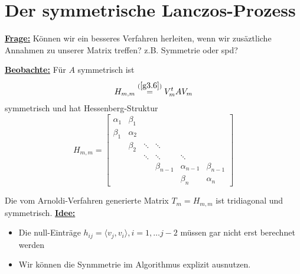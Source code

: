 \documentclass{book}
\begin{document}
        \section{Der symmetrische Lanczos-Prozess}

            \underline{\textbf{Frage:}} Können wir ein besseres Verfahren herleiten, wenn wir zusäztliche
            Annahmen zu unserer Matrix treffen?
            z.B. Symmetrie oder spd?

            \underline{\textbf{Beobachte:}} Für $A$ symmetrisch ist 
            \begin{equation*}
                H_{m,m} \stackrel{(\ref{g3.6})}{=} V_m^t A V_m
            \end{equation*}
            symmetrisch und hat Hessenberg-Struktur 
            \begin{equation*}
                H_{m,m}=\begin{bmatrix}
                    \alpha_1 & \beta_1 & & & & \\
                    \beta_1 & \alpha_2 & & & & \\
                     & \beta_2 & \ddots & \ddots&  & \\
                     &  & \ddots & \ddots & \ddots  & \\
                     &  & & \beta_{n-1} & \alpha_{n-1} & \beta_{n-1}\\
                     &  & & & \beta_n & \alpha_n 
                \end{bmatrix}
            \end{equation*} 

            Die vom Arnoldi-Verfahren generierte Matrix $T_m=H_{m,m}$ ist tridiagonal und symmetrisch.
            \underline{\textbf{Idee:}} 
            \begin{itemize}
                \item Die null-Einträge $h_{ij}=\langle v_j,v_i \rangle, i=1,\dots j-2$ müssen gar nicht erst berechnet werden
                \item Wir können die Synmmetrie im Algorithmus explizit ausnutzen.
            \end{itemize}
            
\end{document}
